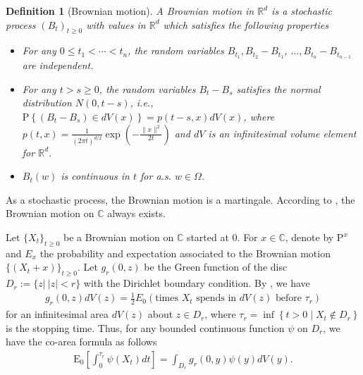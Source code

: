 \documentclass[12pt]{amsart}
\newtheorem{definition}[theorem]{Definition}
\newcommand{\C}{{\mathbb{C}}}
\begin{document}
\begin{definition}[Brownian motion]\label{2.2}
A Brownian motion in $\mathbb{R}^{d}$ is a stochastic process $\left(B_{t}\right)_{t \ge 0}$ with values in $\mathbb{R}^{d}$ which satisfies the following properties
\begin{itemize}
\item[(i)] For any $0 \le t_{1}<\cdots<t_{n}$, the random variables $B_{t_{1}}, B_{t_{2}}-B_{t_{1}}$, $\ldots, B_{t_{n}}-B_{t_{n-1}}$ are independent.
\item[(ii)] For any $t>s \ge 0$, the random variables $B_{t}-B_{s}$ satisfies the normal distribution $N(0, t-s)$, i.e., $\mathrm{P}\left\{\left(B_{t}-B_{s}\right) \in d V(x)\right\}=p(t-s, x) d V(x)$, where $p(t, x)=\frac{1}{(2 \pi t)^{d / 2}} \exp\left(-\frac{\|x\|^{2}}{2 t}\right)$ and $d V$ is an infinitesimal volume element for $\mathbb{R}^{d}$.
\item[(iii)] $B_{t}(w)$ is continuous in $t$ for a.s. $w \in \Omega$.
\end{itemize}
\end{definition}
As a stochastic process, the Brownian motion is a martingale. According to \cite{B}, the Brownian motion on $\C$ always exists.

Let $\{X_{t}\}_{t\ge 0}$ be a Brownian motion on $\C$ started at $0$. For $x\in\C$, denote by $\mathrm{P}^x$ and $E_x$ the probability and expectation associated to the Brownian motion $\{(X_{t}+x)\}_{t\ge 0}$. Let $g_{r}(0, z)$ be the Green function of the disc $D_{r}:=\{z|\ |z|<r\}$ with the Dirichlet boundary condition. By \cite[Subsection 7.4]{I}, we have
\begin{align}\label{1}
g_{r}(0, z) d V(z)=\frac{1}{2} E_{0}\left(\text {times } X_{t} \text { spends in } d V(z) \text { before } \tau_{r}\right) 
\end{align}
for an infinitesimal area $d V(z)$ about $z \in D_{r}$, where $\tau_{r}=\inf \left\{t>0 \mid X_{t} \notin D_{r}\right\}$ is the stopping time. Thus, for any bounded continuous function $\psi$ on $D_{r}$, we have the co-area formula as follows
\begin{align}\label{2}
\mathrm{E}_{0}\left[\int_{0}^{\tau_{r}} \psi\left(X_{t}\right) d t\right]=\int_{D_{r}} g_{r}(0, y) \psi(y) d V(y). 
\end{align}
\end{document}
